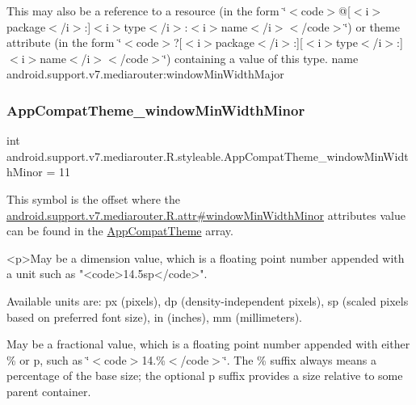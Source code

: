 This may also be a reference to a resource (in the form \char`\"{}$<$code$>$@\mbox{[}$<$i$>$package$<$/i$>$\+:\mbox{]}$<$i$>$type$<$/i$>$\+:$<$i$>$name$<$/i$>$$<$/code$>$\char`\"{}) or theme attribute (in the form \char`\"{}$<$code$>$?\mbox{[}$<$i$>$package$<$/i$>$\+:\mbox{]}\mbox{[}$<$i$>$type$<$/i$>$\+:\mbox{]}$<$i$>$name$<$/i$>$$<$/code$>$\char`\"{}) containing a value of this type.  name android.\+support.\+v7.\+mediarouter\+:window\+Min\+Width\+Major \mbox{\label{classandroid_1_1support_1_1v7_1_1mediarouter_1_1R_1_1styleable_aa71bde585a9d55a3de254d2ece1c876d}} 
\subsubsection{\texorpdfstring{App\+Compat\+Theme\+\_\+window\+Min\+Width\+Minor}{AppCompatTheme\_windowMinWidthMinor}}
{\footnotesize\ttfamily int android.\+support.\+v7.\+mediarouter.\+R.\+styleable.\+App\+Compat\+Theme\+\_\+window\+Min\+Width\+Minor = 11\hspace{0.3cm}{\ttfamily [static]}}

This symbol is the offset where the \hyperlink{classandroid_1_1support_1_1v7_1_1mediarouter_1_1R_1_1attr_acdc05eee53f13576d9e2e5bfd4295487}{android.\+support.\+v7.\+mediarouter.\+R.\+attr\#window\+Min\+Width\+Minor} attribute\textquotesingle{}s value can be found in the \hyperlink{classandroid_1_1support_1_1v7_1_1mediarouter_1_1R_1_1styleable_a4e3d3900c75d49aeb2f283cac00214d6}{App\+Compat\+Theme} array.

\begin{DoxyVerb}      <p>May be a dimension value, which is a floating point number appended with a unit such as "<code>14.5sp</code>".
\end{DoxyVerb}
 Available units are\+: px (pixels), dp (density-\/independent pixels), sp (scaled pixels based on preferred font size), in (inches), mm (millimeters). 

May be a fractional value, which is a floating point number appended with either \% or p, such as \char`\"{}$<$code$>$14.\%$<$/code$>$\char`\"{}. The \% suffix always means a percentage of the base size; the optional p suffix provides a size relative to some parent container. 

